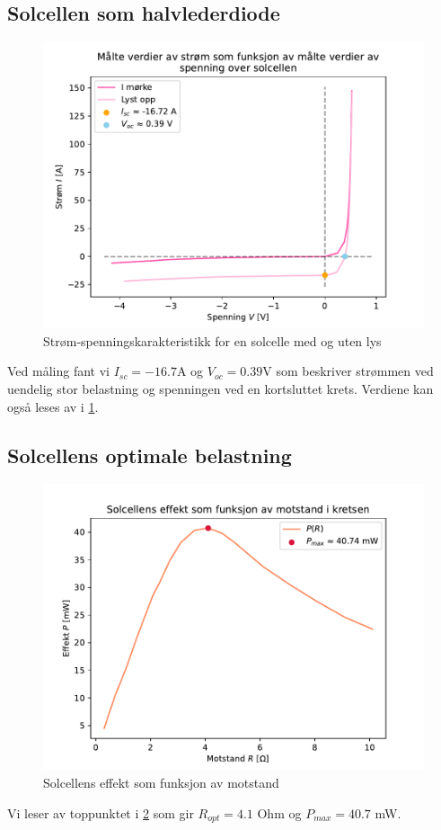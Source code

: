 \documentclass[reprint,norsk,notitlepage]{revtex4-2}
\begin{document}
\subsection{Solcellen som halvlederdiode}
\begin{figure}[h!]
  \centering
  \includegraphics[width = .4\textwidth]{solcellen-oppg-1.pdf}
  \caption{Strøm-spenningskarakteristikk for en solcelle med og uten lys}
  \label{fig: strom-spenningskarakteristikk}
\end{figure}

Ved måling fant vi $I_{sc} = -16.7$A og $V_{oc} = 0.39$V som beskriver strømmen ved uendelig stor belastning og spenningen ved en kortsluttet krets. Verdiene kan også leses av i \cref{fig: strom-spenningskarakteristikk}.

\subsection{Solcellens optimale belastning}
\begin{figure}[h!]
  \centering
  \includegraphics[width = .4\textwidth]{solcellen-oppg-2.pdf}
  \caption{Solcellens effekt som funksjon av motstand}
  \label{fig: effekt-motstand}
\end{figure}
Vi leser av toppunktet i \cref{fig: effekt-motstand} som gir $R_{opt} = 4.1$ Ohm og $P_{max} = 40.7$ mW.
\end{document}
